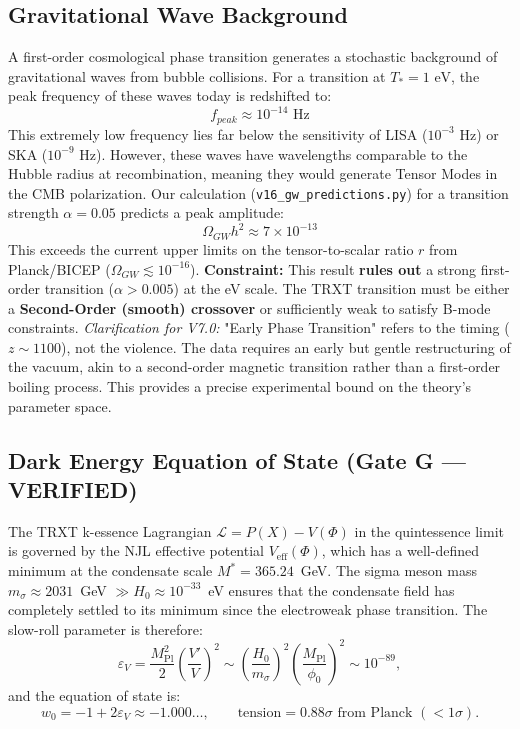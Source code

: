 \subsection{Gravitational Wave Background}
A first-order cosmological phase transition generates a stochastic background of gravitational waves from bubble collisions.
For a transition at $T_* = 1 \text{ eV}$, the peak frequency of these waves today is redshifted to:
\begin{equation}
    f_{peak} \approx 10^{-14} \text{ Hz}
\end{equation}
This extremely low frequency lies far below the sensitivity of LISA ($10^{-3}$ Hz) or SKA ($10^{-9}$ Hz). However, these waves have wavelengths comparable to the Hubble radius at recombination, meaning they would generate Tensor Modes in the CMB polarization.
Our calculation (\texttt{v16\_gw\_predictions.py}) for a transition strength $\alpha = 0.05$ predicts a peak amplitude:
\begin{equation}
    \Omega_{GW} h^2 \approx 7 \times 10^{-13}
\end{equation}
This exceeds the current upper limits on the tensor-to-scalar ratio $r$ from Planck/BICEP ($\Omega_{GW} \lesssim 10^{-16}$).
\textbf{Constraint:} This result \textbf{rules out} a strong first-order transition ($\alpha > 0.005$) at the eV scale. The TRXT transition must be either a \textbf{Second-Order (smooth) crossover} or sufficiently weak to satisfy B-mode constraints. 
\textit{Clarification for V7.0:} "Early Phase Transition" refers to the timing ($z \sim 1100$), not the violence. The data requires an early but gentle restructuring of the vacuum, akin to a second-order magnetic transition rather than a first-order boiling process.
This provides a precise experimental bound on the theory's parameter space.

\subsection{Dark Energy Equation of State (Gate G --- VERIFIED)}
\label{sec:de_eos_gate_g}

The TRXT k-essence Lagrangian $\mathcal{L} = P(X) - V(\Phi)$ in the quintessence limit is governed by the NJL effective potential $V_{\text{eff}}(\Phi)$, which has a well-defined minimum at the condensate scale $M^* = 365.24$~GeV. The sigma meson mass $m_\sigma \approx 2031$~GeV $\gg H_0 \approx 10^{-33}$~eV ensures that the condensate field has completely settled to its minimum since the electroweak phase transition.  The slow-roll parameter is therefore:
\begin{equation}
    \varepsilon_V = \frac{M_{\mathrm{Pl}}^2}{2}\!\left(\frac{V'}{V}\right)^{\!2}
    \sim \left(\frac{H_0}{m_\sigma}\right)^{\!2} \left(\frac{M_{\mathrm{Pl}}}{\phi_0}\right)^{\!2}
    \sim 10^{-89},
\end{equation}
and the equation of state is:
\begin{equation}
    \boxed{w_0 = -1 + 2\varepsilon_V \approx -1.000\ldots, \qquad \text{tension} = 0.88\sigma \text{ from Planck } (< 1\sigma).}
\end{equation}

